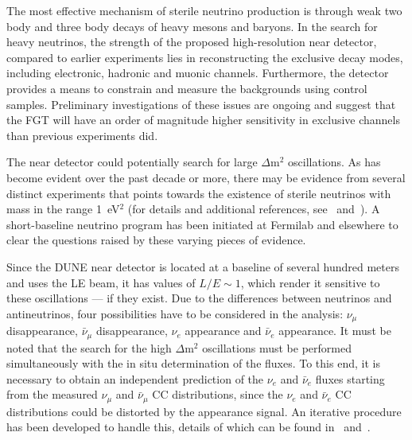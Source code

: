 The most effective mechanism of sterile neutrino production is through
weak two body and three body decays of heavy mesons and baryons. In
the search for heavy neutrinos, the strength of the proposed
high-resolution near detector, compared to earlier experiments lies in
reconstructing the exclusive decay modes, including electronic,
hadronic and muonic channels. Furthermore, the detector provides a
means to constrain and measure the backgrounds using control
samples. Preliminary investigations of these issues are ongoing and
suggest that the FGT will have an order of magnitude higher
sensitivity in exclusive channels than previous experiments did.


The near detector could potentially search for large $\Delta$m$^2$
oscillations. As has become evident over the past decade or more,
there may be evidence from several distinct experiments that points
towards the existence of sterile neutrinos with mass in the range
1~eV$^2$ (for details and additional references, see~\cite{DPR}
and~\cite{Adams:2013qkq}).  A short-baseline neutrino program has been
initiated at Fermilab and elsewhere to clear the questions raised by
these varying pieces of evidence.

Since the DUNE near detector is located at a baseline of several
hundred meters and uses the LE beam, it has values of $L/E \sim 1$,
which render it sensitive to these oscillations --- if they exist. Due
to the differences between neutrinos and antineutrinos, four
possibilities have to be considered in the analysis: $\nu_\mu$
disappearance, $\bar \nu_\mu$ disappearance, $\nu_e$ appearance and
$\bar \nu_e$ appearance.  It must be noted that the search for the
high $\Delta$m$^2$ oscillations must be performed simultaneously with
the in situ determination of the fluxes.  To this end, it is necessary
to obtain an independent prediction of the $\nu_e$ and $\bar \nu_e$
fluxes starting from the measured $\nu_\mu$ and $\bar \nu_\mu$ CC
distributions, since the $\nu_e$ and $\bar \nu_e$ CC distributions
could be distorted by the appearance signal.  An iterative procedure
has been developed to handle this, details of which
can be found in~\cite{DPR} and~\cite{Adams:2013qkq}.\\

